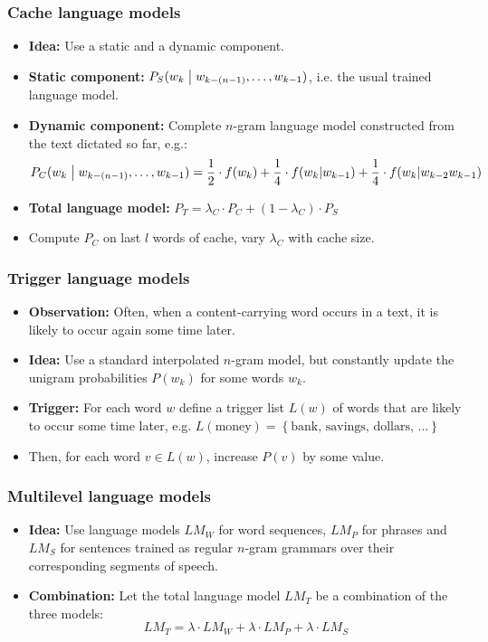 \documentclass[11pt]{article}
\begin{document}
\subsubsection{Cache language models}
\begin{itemize}
    \item \textbf{Idea:} Use a static and a dynamic component.
    \item \textbf{Static component:} $P_S(w_k \bigm| w_{k-(n-1)}, \ldots, w_{k-1})$, i.e. the usual trained language model.
    \item \textbf{Dynamic component:} Complete $n$-gram language model constructed from the text dictated so far, e.g.:
        \[
            P_C(w_k \bigm| w_{k-(n-1)}, \ldots, w_{k-1}) = \frac{1}{2} \cdot f(w_k) + \frac{1}{4} \cdot f(w_k | w_{k-1}) + \frac{1}{4} \cdot f(w_k | w_{k-2} w_{k-1})
        \]
    \item \textbf{Total language model:} $P_T = \lambda_C \cdot P_C + (1 - \lambda_C) \cdot P_S$
    \item Compute $P_C$ on last $l$ words of cache, vary $\lambda_C$ with cache size.
\end{itemize}

\subsubsection{Trigger language models}
\begin{itemize}
    \item \textbf{Observation:} Often, when a content-carrying word occurs in a text, it is likely to occur again some time later.
    \item \textbf{Idea:} Use a standard interpolated $n$-gram model, but constantly update the unigram probabilities $P(w_k)$ for some words $w_k$.
    \item \textbf{Trigger:} For each word $w$ define a trigger list $L(w)$ of words that are likely to occur some time later, e.g. $L(\mbox{money}) = \left\{\mbox{bank}, \, \mbox{savings}, \, \mbox{dollars}, \, \ldots \right\}$
    \item Then, for each word $v \in L(w)$, increase $P(v)$ by some value.
\end{itemize}

\subsubsection{Multilevel language models}
\begin{itemize}
    \item \textbf{Idea:} Use language models $LM_W$ for word sequences, $LM_P$ for phrases and $LM_S$ for sentences trained as regular $n$-gram grammars over their corresponding segments of speech.
    \item \textbf{Combination:} Let the total language model $LM_T$ be a combination of the three models:
        \[
        LM_T = \lambda \cdot LM_W + \lambda \cdot LM_P + \lambda \cdot LM_S
        \]
\end{itemize}
\end{document}
